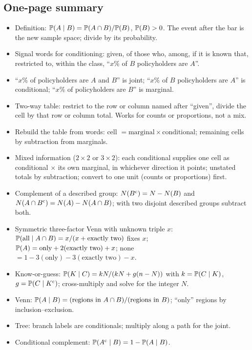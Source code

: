 \subsection{One-page summary}

\begin{itemize}[nosep]
\item Definition: $\mathbb{P}(A \mid B) = \mathbb{P}(A \cap B)/\mathbb{P}(B)$, $\mathbb{P}(B) > 0$. The
event after the bar is the new sample space; divide by its probability.
\item Signal words for conditioning: given, of those who, among, if it is known
that, restricted to, within the class, ``$x$\% of $B$ policyholders are $A$''.
\item ``$x$\% of policyholders are $A$ and $B$'' is joint; ``$x$\% of $B$
policyholders are $A$'' is conditional; ``$x$\% of policyholders are $B$'' is marginal.
\item Two-way table: restrict to the row or column named after ``given'', divide
the cell by that row or column total. Works for counts or proportions, not a mix.
\item Rebuild the table from words: cell $= \text{marginal} \times \text{conditional}$;
remaining cells by subtraction from marginals.
\item Mixed information ($2 \times 2$ or $3 \times 2$): each conditional supplies one
cell as conditional $\times$ its own marginal, in whichever direction it points;
unstated totals by subtraction; convert to one unit (counts or proportions) first.
\item Complement of a described group: $N(B^{\mathrm{c}}) = N - N(B)$ and
$N(A \cap B^{\mathrm{c}}) = N(A) - N(A \cap B)$; with two disjoint described groups
subtract both.
\item Symmetric three-factor Venn with unknown triple $x$:
$\mathbb{P}(\text{all} \mid A \cap B) = x/(x + \text{exactly two})$ fixes $x$;
$\mathbb{P}(A) = \text{only} + 2(\text{exactly two}) + x$; none $= 1 - 3(\text{only}) - 3(\text{exactly two}) - x$.
\item Know-or-guess: $\mathbb{P}(K \mid C) = kN/(kN + g(n - N))$ with $k = \mathbb{P}(C \mid K)$,
$g = \mathbb{P}(C \mid K^{\mathrm{c}})$; cross-multiply and solve for the integer $N$.
\item Venn: $\mathbb{P}(A \mid B) = (\text{regions in } A \cap B)/(\text{regions in } B)$;
``only'' regions by inclusion--exclusion.
\item Tree: branch labels are conditionals; multiply along a path for the joint.
\item Conditional complement: $\mathbb{P}(A^{\mathrm{c}} \mid B) = 1 - \mathbb{P}(A \mid B)$.

\end{itemize}
